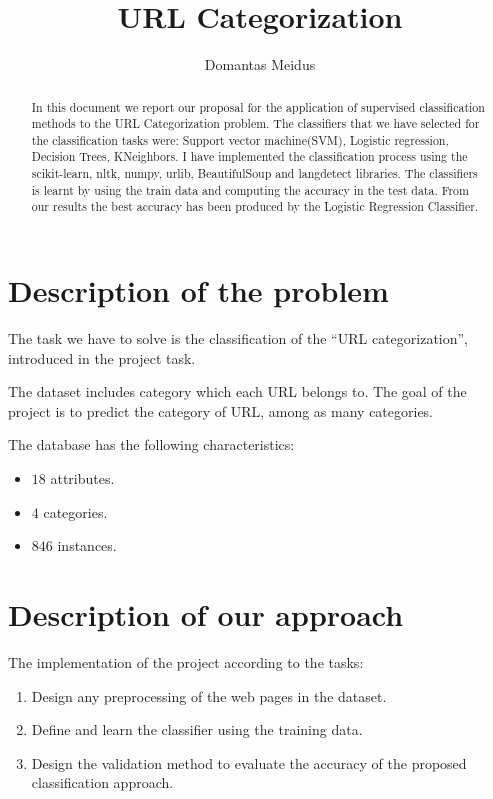 \documentclass{article} %
\title{URL Categorization}
\author{Domantas Meidus}
\begin{document}
\maketitle



\begin{abstract}
  In this document we report our proposal for the application of supervised classification methods to the URL Categorization problem. The classifiers that we have selected for the classification tasks were: Support vector machine(SVM), Logistic regression, Decision Trees, KNeighbors. I have implemented the classification process using the scikit-learn, nltk, numpy, urlib, BeautifulSoup and langdetect libraries. The classifiers is learnt by using the train data and computing the accuracy in the test data. From our results the best accuracy has been produced by the Logistic Regression Classifier.
\end{abstract}

\section{Description of the problem}
 
 The task we have to solve is the classification of the  ``URL categorization'', introduced in the project task. 
 
 The dataset includes category which each URL belongs to. The goal of the project is to predict the category of URL, among as many categories.

  The database has the following characteristics: 

\begin{itemize}
  \item $18$ attributes.
  \item $4$ categories.
  \item $846$ instances. 
\end{itemize}


\section{Description of our approach}
  
 The implementation of the project according to the tasks:

\begin{enumerate} 

 \item Design any preprocessing of the web pages in the dataset.

 \item Define and learn the classifier using the training data.

 \item  Design the validation method to evaluate the accuracy of the proposed classification approach.
 
\end{enumerate} 
\end{document}
